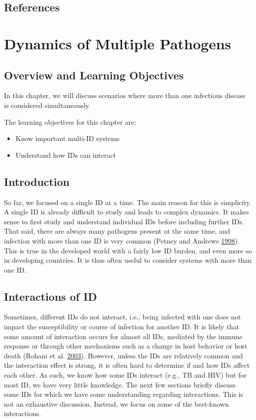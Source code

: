 \documentclass[]{book}
\providecommand{\tightlist}{%
  \setlength{\itemsep}{0pt}\setlength{\parskip}{0pt}}
\theoremstyle{definition}
\theoremstyle{definition}
\theoremstyle{definition}
\theoremstyle{remark}
\begin{document}
\section{References}\label{references-10}

\chapter{Dynamics of Multiple
Pathogens}\label{dynamics-of-multiple-pathogens}

\section{Overview and Learning
Objectives}\label{overview-and-learning-objectives-10}

In this chapter, we will discuss scenarios where more than one
infectious disease is considered simultaneously.

The learning objectives for this chapter are:

\begin{itemize}
\tightlist
\item
  Know important multi-ID systems
\item
  Understand how IDs can interact
\end{itemize}

\section{Introduction}\label{introduction-10}

So far, we focused on a single ID at a time. The main reason for this is
simplicity. A single ID is already difficult to study and leads to
complex dynamics. It makes sense to first study and understand
individual IDs before including further IDs. That said, there are always
many pathogens present at the same time, and infection with more than
one ID is very common (Petney and Andrews
\protect\hyperlink{ref-petney98}{1998}). This is true in the developed
world with a fairly low ID burden, and even more so in developing
countries. It is thus often useful to consider systems with more than
one ID.

\section{Interactions of ID}\label{interactions-of-id}

Sometimes, different IDs do not interact, i.e., being infected with one
does not impact the susceptibility or course of infection for another
ID. It is likely that some amount of interaction occurs for almost all
IDs, mediated by the immune response or through other mechanisms such as
a change in host behavior or host death (Rohani et al.
\protect\hyperlink{ref-rohani03}{2003}). However, unless the IDs are
relatively common and the interaction effect is strong, it is often hard
to determine if and how IDs affect each other. As such, we know how some
IDs interact (e.g., TB and HIV) but for most ID, we have very little
knowledge. The next few sections briefly discuss some IDs for which we
have some understanding regarding interactions. This is not an
exhaustive discussion. Instead, we focus on some of the best-known
interactions.
\end{document}

